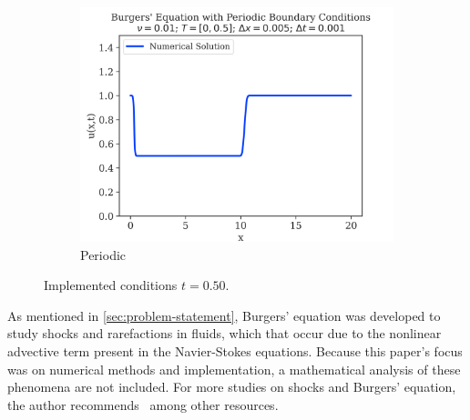 \begin{figure}
\begin{subfigure}{0.55\linewidth}
		\includegraphics[width=\linewidth]{../periodic_BC/images_nu=0.01/500_plot}
		\caption{Periodic}
	\end{subfigure}
	\hfill

	\caption{Implemented conditions $t=0.50$.}
	\label{fig:final-figures}
\end{figure}

As mentioned in \cref{sec:problem-statement}, Burgers' equation was developed to study shocks and rarefactions in fluids, which that occur due to the nonlinear advective term present in the Navier-Stokes equations.
Because this paper's focus was on numerical methods and implementation, a mathematical analysis of these phenomena are not included.
For more studies on shocks and Burgers' equation, the author recommends~\autocite{salihBurgersEquation2016,cameronNOTESBURGERSEQUATION} among other resources.